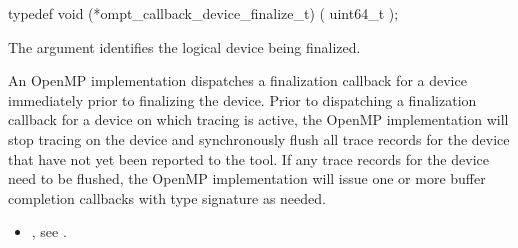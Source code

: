 \format

\begin{ccppspecific}
\begin{omptCallback}
typedef void (*ompt_callback_device_finalize_t) (
  uint64_t 
);
\end{omptCallback}
\end{ccppspecific}


\argdesc

The argument  identifies the logical device
being finalized.

\descr

An OpenMP implementation dispatches a finalization callback for a
device immediately prior to finalizing the device. Prior to dispatching
a finalization callback for a device on which tracing is active,
the OpenMP implementation will stop tracing on the device and
synchronously flush all trace records for the device 
that have not yet been reported to the tool. 
If any trace records for the device need to be flushed,
the OpenMP implementation will issue one or more
buffer completion callbacks with type signature 
as needed.

\crossreferences
\begin{itemize}
\item {}, see
  .
\end{itemize}
